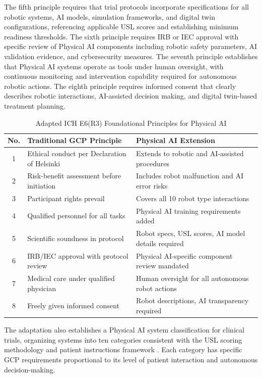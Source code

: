 The fifth principle requires that trial protocols incorporate specifications
for all robotic systems, AI models, simulation frameworks, and digital twin
configurations, referencing applicable USL scores \cite{usl-standard} and
establishing minimum readiness thresholds. The sixth principle requires IRB or
IEC approval with specific review of Physical AI components including robotic
safety parameters, AI validation evidence, and cybersecurity measures. The
seventh principle establishes that Physical AI systems operate as tools under
human oversight, with continuous monitoring and intervention capability
required for autonomous robotic actions. The eighth principle requires informed
consent that clearly describes robotic interactions, AI-assisted decision
making, and digital twin-based treatment planning.

\begin{table}[H]
\centering
\caption{Adapted ICH E6(R3) Foundational Principles for Physical AI}
\label{tab:ich-principles}
\small
\begin{tabularx}{\textwidth}{c X X}
\toprule
\textbf{No.} & \textbf{Traditional GCP Principle} & \textbf{Physical AI Extension} \\
\midrule
1 & Ethical conduct per Declaration of Helsinki & Extends to robotic and AI-assisted procedures \\
2 & Risk-benefit assessment before initiation & Includes robot malfunction and AI error risks \\
3 & Participant rights prevail & Covers all 10 robot type interactions \\
4 & Qualified personnel for all tasks & Physical AI training requirements added \\
5 & Scientific soundness in protocol & Robot specs, USL scores, AI model details required \\
6 & IRB/IEC approval with protocol review & Physical AI-specific component review mandated \\
7 & Medical care under qualified physician & Human oversight for all autonomous robot actions \\
8 & Freely given informed consent & Robot descriptions, AI transparency required \\
\bottomrule
\end{tabularx}
\end{table}

The adaptation also establishes a Physical AI system classification for clinical
trials, organizing systems into ten categories consistent with the USL scoring
methodology \cite{usl-standard} and patient instructions framework
\cite{patient-instructions-paper}. Each category has specific GCP requirements
proportional to its level of patient interaction and autonomous decision-making.


